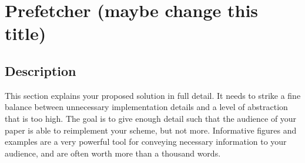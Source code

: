 \section{Prefetcher (maybe change this title)}
\label{sec:prefetcher}
\subsection{Description}
This section explains your proposed solution in full detail.
It needs to strike a fine balance between unnecessary implementation
details and a level of abstraction that is too high.
The goal is to give enough detail such that the audience of
your paper is able to reimplement your scheme, but not more.
Informative figures and examples are a very powerful tool for
conveying necessary information to your audience, and are
often worth more than a thousand words.
